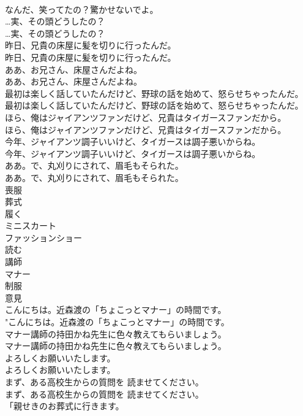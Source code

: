 \documentclass[8pt]{extreport}
\begin{document}
\begin{CJK}{UTF8}{min}
\\	なんだ、笑ってたの？驚かせないでよ。 
\\	…実、その頭どうしたの？	
\\	…実、その頭どうしたの？ 
\\	昨日、兄貴の床屋に髪を切りに行ったんだ。	
\\	昨日、兄貴の床屋に髪を切りに行ったんだ。 
\\	ああ、お兄さん、床屋さんだよね。	
\\	ああ、お兄さん、床屋さんだよね。 
\\	最初は楽しく話していたんだけど、野球の話を始めて、怒らせちゃったんだ。	
\\	最初は楽しく話していたんだけど、野球の話を始めて、怒らせちゃったんだ。 
\\	ほら、俺はジャイアンツファンだけど、兄貴はタイガースファンだから。	
\\	ほら、俺はジャイアンツファンだけど、兄貴はタイガースファンだから。 
\\	今年、ジャイアンツ調子いいけど、タイガースは調子悪いからね。	
\\	今年、ジャイアンツ調子いいけど、タイガースは調子悪いからね。 
\\	ああ。で、丸刈りにされて、眉毛もそられた。	
\\	ああ。で、丸刈りにされて、眉毛もそられた。 
\\	喪服
\\	葬式
\\	履く
\\	ミニスカート
\\	ファッションショー
\\	読む
\\	講師
\\	マナー
\\	制服
\\	意見
\\	こんにちは。近森渡の「ちょこっとマナー」の時間です。	
\\	"こんにちは。近森渡の「ちょこっとマナー」の時間です。 
\\	マナー講師の持田かね先生に色々教えてもらいましょう。	
\\	マナー講師の持田かね先生に色々教えてもらいましょう。 
\\	よろしくお願いいたします。	
\\	よろしくお願いいたします。 
\\	まず、ある高校生からの質問を 読ませてください。	
\\	まず、ある高校生からの質問を 読ませてください。 
\\	「親せきのお葬式に行きます。	

\end{CJK}
\end{document}
